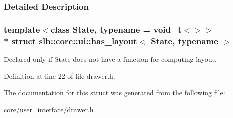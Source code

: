 \subsubsection{Detailed Description}
\subsubsection*{template$<$class State, typename = void\+\_\+t$<$$>$$>$\\*
struct slb\+::core\+::ui\+::has\+\_\+layout$<$ State, typename $>$}

Declared only if {\ttfamily State} does not have a function for computing layout. 

Definition at line 22 of file drawer.\+h.



The documentation for this struct was generated from the following file\+:\begin{DoxyCompactItemize}
\item 
core/user\+\_\+interface/\hyperlink{drawer_8h}{drawer.\+h}\end{DoxyCompactItemize}

